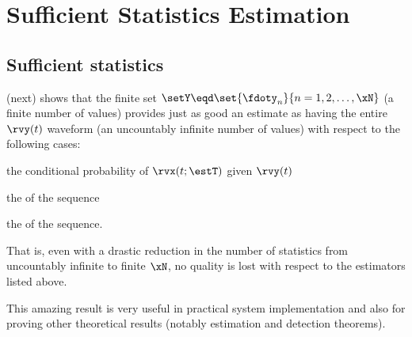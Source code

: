 \chapter{Sufficient Statistics Estimation}
\section{Sufficient statistics}
 (next) shows that the finite set
$\setY\eqd\set{\fdoty_n}{n=1,2,\ldots,\xN}$ (a finite number of values) provides just as
good an estimate as having the entire $\rvy(t)$ waveform
(an uncountably infinite number of values)
with respect to the following cases:
\begin{enume}
   \item the conditional probability of $\rvx(t;\estT)$ given $\rvy(t)$
   \item the  of the sequence
   \item the   of the sequence.
\end{enume}
That is, even with a drastic reduction in the number of statistics
from uncountably infinite to finite $\xN$,
no quality is lost with respect to the estimators listed above.

This amazing result is very useful in practical system implementation
and also for proving other theoretical results
(notably estimation and detection theorems).

